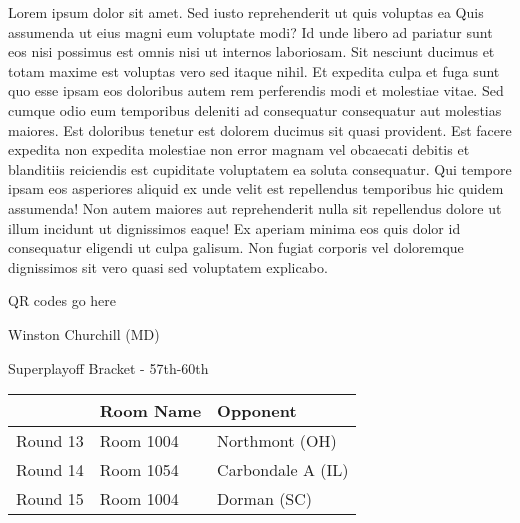 \documentclass{article}%
\begin{document}
\vspace*{8pt}%
\linebreak%
\newline%
\newline%
Lorem ipsum dolor sit amet. Sed iusto reprehenderit ut quis voluptas ea Quis assumenda ut eius magni eum voluptate modi? Id unde libero ad pariatur sunt eos nisi possimus est omnis nisi ut internos laboriosam. Sit nesciunt ducimus et totam maxime est voluptas vero sed itaque nihil. Et expedita culpa et fuga sunt quo esse ipsam eos doloribus autem rem perferendis modi et molestiae vitae.\newline%
\newline%
Sed cumque odio eum temporibus deleniti ad consequatur consequatur aut molestias maiores. Est doloribus tenetur est dolorem ducimus sit quasi provident. Est facere expedita non expedita molestiae non error magnam vel obcaecati debitis et blanditiis reiciendis est cupiditate voluptatem ea soluta consequatur. Qui tempore ipsam eos asperiores aliquid ex unde velit est repellendus temporibus hic quidem assumenda!\newline%
\newline%
Non autem maiores aut reprehenderit nulla sit repellendus dolore ut illum incidunt ut dignissimos eaque! Ex aperiam minima eos quis dolor id consequatur eligendi ut culpa galisum. Non fugiat corporis vel doloremque dignissimos sit vero quasi sed voluptatem explicabo.\newline%
\newline%
%
\vspace*{30pt}%
\begin{center}%
\begin{Huge}%
QR codes go here%
\end{Huge}%
\end{center}%
\newpage%
\begin{center}%
\begin{Huge}%
Winston Churchill (MD)%
\end{Huge}%
\vspace*{8pt}%
\linebreak%
\begin{Large}%
Superplayoff Bracket {-} 57th{-}60th%
\end{Large}%
\end{center}%
%
\begin{tabularx}{\textwidth}{|c|Y|Y|}%
\hline%
&Room Name&Opponent\\%
\hline%
Round 13&Room 1004&Northmont (OH)\\%
Round 14&Room 1054&Carbondale A (IL)\\%
Round 15&Room 1004&Dorman (SC)\\%
\hline%
\end{tabularx}%
\end{document}
